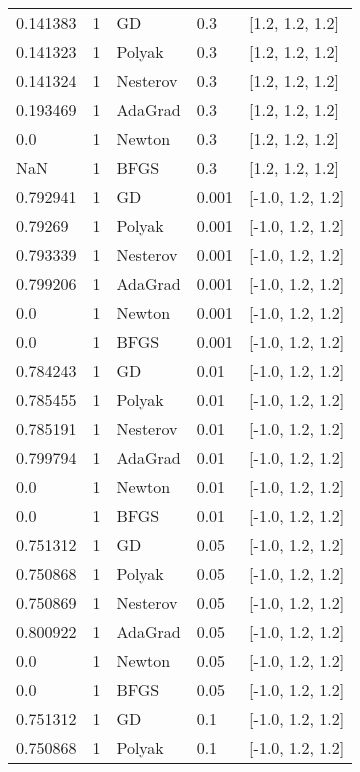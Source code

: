 \begin{tabular}{lllll}
 0.141383 &        1 &       GD &    0.3 &  [1.2, 1.2, 1.2] \\
 0.141323 &        1 &   Polyak &    0.3 &  [1.2, 1.2, 1.2] \\
 0.141324 &        1 & Nesterov &    0.3 &  [1.2, 1.2, 1.2] \\
 0.193469 &        1 &  AdaGrad &    0.3 &  [1.2, 1.2, 1.2] \\
      0.0 &        1 &   Newton &    0.3 &  [1.2, 1.2, 1.2] \\
      NaN &        1 &     BFGS &    0.3 &  [1.2, 1.2, 1.2] \\
 0.792941 &        1 &       GD &  0.001 & [-1.0, 1.2, 1.2] \\
  0.79269 &        1 &   Polyak &  0.001 & [-1.0, 1.2, 1.2] \\
 0.793339 &        1 & Nesterov &  0.001 & [-1.0, 1.2, 1.2] \\
 0.799206 &        1 &  AdaGrad &  0.001 & [-1.0, 1.2, 1.2] \\
      0.0 &        1 &   Newton &  0.001 & [-1.0, 1.2, 1.2] \\
      0.0 &        1 &     BFGS &  0.001 & [-1.0, 1.2, 1.2] \\
 0.784243 &        1 &       GD &   0.01 & [-1.0, 1.2, 1.2] \\
 0.785455 &        1 &   Polyak &   0.01 & [-1.0, 1.2, 1.2] \\
 0.785191 &        1 & Nesterov &   0.01 & [-1.0, 1.2, 1.2] \\
 0.799794 &        1 &  AdaGrad &   0.01 & [-1.0, 1.2, 1.2] \\
      0.0 &        1 &   Newton &   0.01 & [-1.0, 1.2, 1.2] \\
      0.0 &        1 &     BFGS &   0.01 & [-1.0, 1.2, 1.2] \\
 0.751312 &        1 &       GD &   0.05 & [-1.0, 1.2, 1.2] \\
 0.750868 &        1 &   Polyak &   0.05 & [-1.0, 1.2, 1.2] \\
 0.750869 &        1 & Nesterov &   0.05 & [-1.0, 1.2, 1.2] \\
 0.800922 &        1 &  AdaGrad &   0.05 & [-1.0, 1.2, 1.2] \\
      0.0 &        1 &   Newton &   0.05 & [-1.0, 1.2, 1.2] \\
      0.0 &        1 &     BFGS &   0.05 & [-1.0, 1.2, 1.2] \\
 0.751312 &        1 &       GD &    0.1 & [-1.0, 1.2, 1.2] \\
 0.750868 &        1 &   Polyak &    0.1 & [-1.0, 1.2, 1.2] \\

\end{tabular}
